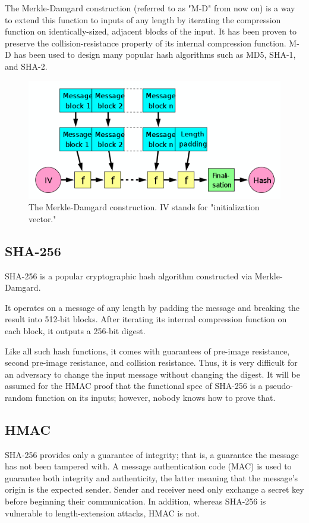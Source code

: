 \documentclass[twocolumn,showpacs,%
  nofootinbib,aps,superscriptaddress,%
  eqsecnum,prd,notitlepage,showkeys,10pt]{revtex4-1}
\begin{document}
The Merkle-Damgard construction (referred to as "M-D" from now on) is a way to extend this function to inputs of any length by iterating the compression function on identically-sized, adjacent blocks of the input. It has been proven to preserve the collision-resistance property of its internal compression function. M-D has been used to design many popular hash algorithms such as MD5, SHA-1, and SHA-2. 

\begin{figure}[h!]
	\centering
	\includegraphics[scale=0.24]{Merkle-Damgard}
	\caption{The Merkle-Damgard construction. IV stands for "initialization vector."}
\end{figure}

\subsection{SHA-256}

SHA-256 is a popular cryptographic hash algorithm constructed via Merkle-Damgard.

It operates on a message of any length by padding the message and breaking the result into 512-bit blocks. After iterating its internal compression function on each block, it outputs a 256-bit digest. 

Like all such hash functions, it comes with guarantees of pre-image resistance, second pre-image resistance, and collision resistance. Thus, it is very difficult for an adversary to change the input message without changing the digest. It will be assumed for the HMAC proof that the functional spec of SHA-256 is a pseudo-random function on its inputs; however, nobody knows how to prove that.

\subsection{HMAC}

SHA-256 provides only a guarantee of integrity; that is, a guarantee the message has not been tampered with. A message authentication code (MAC) is used to guarantee both integrity and authenticity, the latter meaning that the message's origin is the expected sender. Sender and receiver need only exchange a secret key before beginning their communication. In addition, whereas SHA-256 is vulnerable to length-extension attacks, HMAC is not.
\end{document}
